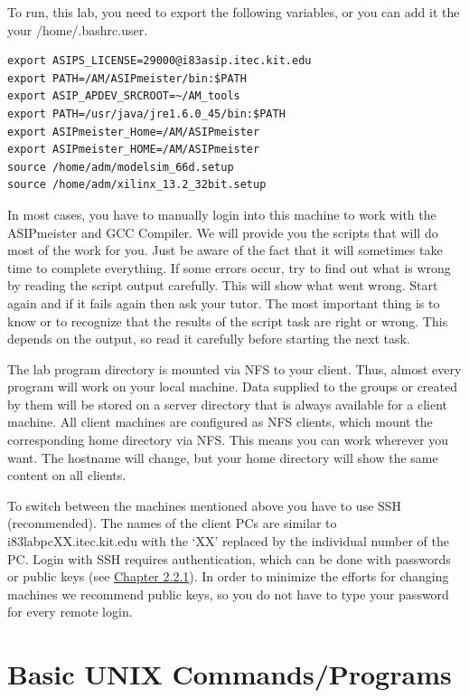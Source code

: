 To run, this lab, you need to export the following variables, or you can
add it the your /home/.bashrc.user.
\begin{lstlisting}
export ASIPS_LICENSE=29000@i83asip.itec.kit.edu
export PATH=/AM/ASIPmeister/bin:$PATH
export ASIP_APDEV_SRCROOT=~/AM_tools
export PATH=/usr/java/jre1.6.0_45/bin:$PATH
export ASIPmeister_Home=/AM/ASIPmeister
export ASIPmeister_HOME=/AM/ASIPmeister
source /home/adm/modelsim_66d.setup
source /home/adm/xilinx_13.2_32bit.setup
\end{lstlisting}
In most cases, you have to manually login into this machine to work with
the ASIPmeister and GCC Compiler. We will provide you the scripts that
will do most of the work for you. Just be aware of the fact that it will
sometimes take time to complete everything. If some errors occur, try to
find out what is wrong by reading the script output carefully. This will
show what went wrong. Start again and if it fails again then ask your
tutor. The most important thing is to know or to recognize that the
results of the script task are right or wrong. This depends on the
output, so read it carefully before starting the next task.

The lab program directory is mounted via NFS to your client. Thus,
almost every program will work on your local machine. Data supplied to
the groups or created by them will be stored on a server directory that
is always available for a client machine. All client machines are
configured as NFS clients, which mount the corresponding home directory
via NFS. This means you can work wherever you want. The hostname will
change, but your home directory will show the same content on all
clients.

To switch between the machines mentioned above you have to use SSH
(recommended). The names of the client PCs are similar to
i83labpcXX.itec.kit.edu with the `XX' replaced by the individual number of
the PC. Login with SSH requires authentication, which can be done with
passwords or public keys (see
\protect\hyperlink{remote-operation}{Chapter 2.2.1}). In order to
minimize the efforts for changing machines we recommend public keys, so
you do not have to type your password for every remote login.

\hypertarget{basic-unix-commandsprograms}{%
\section{Basic UNIX
Commands/Programs}\label{basic-unix-commandsprograms}}

